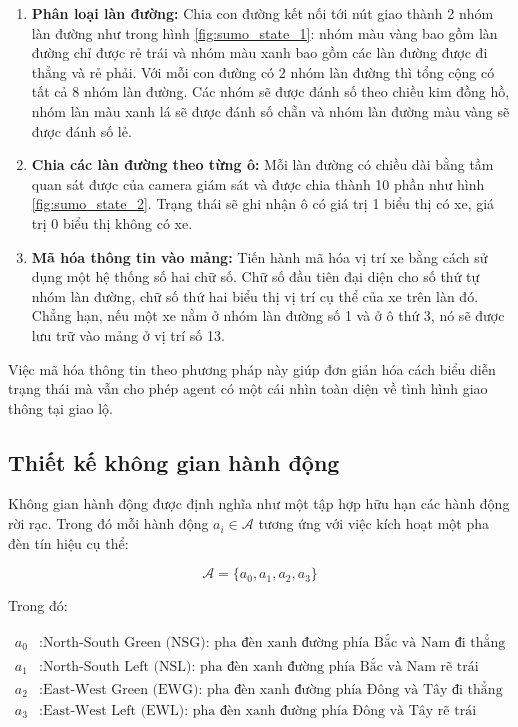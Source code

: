 \begin{enumerate}
    \item \textbf{Phân loại làn đường:} Chia con đường kết nối tới nút giao thành 2 nhóm làn đường như trong hình \ref{fig:sumo_state_1}: nhóm màu vàng bao gồm làn đường chỉ được rẻ trái và nhóm màu xanh bao gồm các làn đường được đi thẳng và rẻ phải. Với mỗi con đường có 2 nhóm làn đường thì tổng cộng có tất cả 8 nhóm làn đường. Các nhóm sẽ được đánh số theo chiều kim đồng hồ, nhóm làn màu xanh lá sẽ được đánh số chẵn và nhóm làn đường màu vàng sẽ được đánh số lẻ.
    \item \textbf{Chia các làn đường theo từng ô:} Mỗi làn đường có chiều dài bằng tầm quan sát được của camera giám sát và được chia thành 10 phần như hình \ref{fig:sumo_state_2}. Trạng thái sẽ ghi nhận ô có giá trị 1 biểu thị có xe, giá trị 0 biểu thị không có xe.
    \item \textbf{Mã hóa thông tin vào mảng:} Tiến hành mã hóa vị trí xe bằng cách sử dụng một hệ thống số hai chữ số. Chữ số đầu tiên đại diện cho số thứ tự nhóm làn đường, chữ số thứ hai biểu thị vị trí cụ thể của xe trên làn đó. Chẳng hạn, nếu một xe nằm ở nhóm làn đường số 1 và ở ô thứ 3, nó sẽ được lưu trữ vào mảng ở vị trí số 13.
\end{enumerate}
Việc mã hóa thông tin theo phương pháp này giúp đơn giản hóa cách biểu diễn trạng thái mà vẫn cho phép agent có một cái nhìn toàn diện về tình hình giao thông tại giao lộ.

\subsection{Thiết kế không gian hành động}
Không gian hành động được định nghĩa như một tập hợp hữu hạn các hành động rời rạc. Trong đó mỗi hành động $a_i \in \mathcal{A}$ tương ứng với việc kích hoạt một pha đèn tín hiệu cụ thể:

\[
    \mathcal{A} = \{a_0, a_1, a_2, a_3\}
\]

Trong đó:

\begin{align}
    a_0 &: \text{North-South Green (NSG): pha đèn xanh đường phía Bắc và Nam đi thẳng} \\
    a_1 &: \text{North-South Left (NSL): pha đèn xanh đường phía Bắc và Nam rẽ trái} \\
    a_2 &: \text{East-West Green (EWG): pha đèn xanh đường phía Đông và Tây đi thẳng} \\
    a_3 &: \text{East-West Left (EWL): pha đèn xanh đường phía Đông và Tây rẽ trái}
\end{align}

